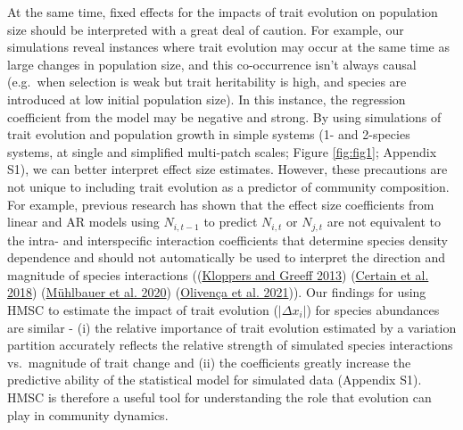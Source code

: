 \documentclass[
]{article}
\begin{document}
At the same time, fixed effects for the impacts of trait evolution on population size should be interpreted with a great deal of caution. For example, our simulations reveal instances where trait evolution may occur at the same time as large changes in population size, and this co-occurrence isn't always causal (e.g.~when selection is weak but trait heritability is high, and species are introduced at low initial population size). In this instance, the regression coefficient from the model may be negative and strong. By using simulations of trait evolution and population growth in simple systems (1- and 2-species systems, at single and simplified multi-patch scales; Figure \ref{fig:fig1}; Appendix S1), we can better interpret effect size estimates. However, these precautions are not unique to including trait evolution as a predictor of community composition. For example, previous research has shown that the effect size coefficients from linear and AR models using \(N_{i,t-1}\) to predict \(N_{i,t}\) or \(N_{j,t}\) are not equivalent to the intra- and interspecific interaction coefficients that determine species density dependence and should not automatically be used to interpret the direction and magnitude of species interactions ((\protect\hyperlink{ref-Kloppers2013}{Kloppers and Greeff 2013}) (\protect\hyperlink{ref-Certain2018}{Certain et al. 2018}) (\protect\hyperlink{ref-Muhlbauer2020}{Mühlbauer et al. 2020}) (\protect\hyperlink{ref-Olivenca2021}{Olivença et al. 2021})). Our findings for using HMSC to estimate the impact of trait evolution (\(|\Delta x_i|\)) for species abundances are similar - (i) the relative importance of trait evolution estimated by a variation partition accurately reflects the relative strength of simulated species interactions vs.~magnitude of trait change and (ii) the coefficients greatly increase the predictive ability of the statistical model for simulated data (Appendix S1). HMSC is therefore a useful tool for understanding the role that evolution can play in community dynamics.
\end{document}
